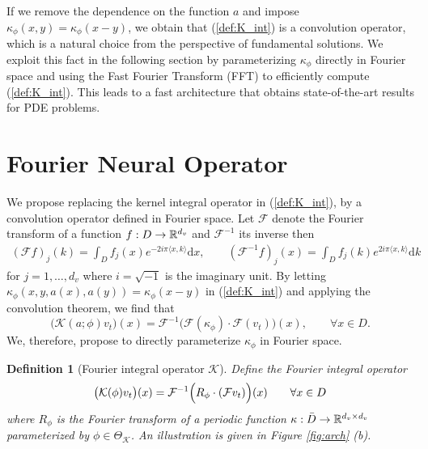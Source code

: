 \documentclass{article} %
\newcommand{\cG}{\mathcal{F}}
\newcommand{\cK}{\mathcal{K}}
\newcommand{\bbZ}{\mathbb{Z}}
\newtheorem{definition}{Definition}
\begin{document}
If we remove the dependence on the function \(a\) and impose  $\kappa_{\phi}(x,y) = \kappa_{\phi}(x-y)$, we obtain that (\ref{def:K_int}) is a convolution operator, which is a natural choice from the perspective of fundamental solutions. We exploit this fact in the following section by parameterizing $\kappa_{\phi}$ directly in Fourier space and using the Fast Fourier Transform (FFT) to efficiently compute (\ref{def:K_int}). This leads to a fast architecture that obtains state-of-the-art results for PDE problems.


\section{Fourier Neural Operator}
\label{sec:fourier}
We propose replacing the kernel integral operator in (\ref{def:K_int}), by a convolution operator defined in Fourier space.  Let \(\cG\) denote the Fourier transform of a function $f: D \to \mathbb{R}^{d_v}$ and $\cG^{-1}$ its inverse then
\begin{align*}
    (\cG f)_j(k) = \int_{D} f_j(x) e^{- 2i \pi \langle x, k \rangle} \mathrm{d}x, \qquad
    (\cG^{-1} f)_j(x) = \int_{D} f_j(k) e^{2i \pi \langle x, k \rangle} \mathrm{d}k
\end{align*}
for $j=1,\dots,d_v$ where \(i = \sqrt{-1}\) is the imaginary unit. By letting $\kappa_{\phi}(x,y,a(x),a(y)) = \kappa_{\phi}(x-y)$ in (\ref{def:K_int}) and applying the convolution theorem, we find that
\[\bigl(\cK(a;\phi)v_t\bigr)(x) = \cG^{-1} \bigl( \cG(\kappa_\phi) \cdot \cG(v_t) \bigr )(x), \qquad \forall x \in D. \]
We, therefore, propose to directly parameterize $\kappa_\phi$ in Fourier space.
\begin{definition}[Fourier integral operator $\cK$] Define the Fourier integral operator
\begin{equation}
\label{eq:Fourier}
\bigl(\cK(\phi)v_t\bigr)(x)=   
\cG^{-1}\Bigl(R_\phi \cdot (\cG v_t) \Bigr)(x) \qquad \forall x \in D 
\end{equation}
where $R_\phi$ is the Fourier transform of a periodic function $\kappa: \bar{D} \to \mathbb{R}^{d_v \times d_v}$ parameterized by \(\phi \in \Theta_\cK\).
An illustration is given in Figure \ref{fig:arch} (b).
\end{definition}
\end{document}
